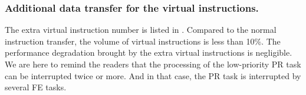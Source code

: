 \subsubsection{ Additional data transfer for the virtual instructions. }

The extra virtual instruction number is listed in . Compared to the normal instruction transfer, the volume of virtual instructions is less than 10\%. The performance degradation brought by the extra virtual instructions is negligible. 
We are here to remind the readers that the processing of the low-priority PR task can be interrupted twice or more. And in that case, the PR task is interrupted by several FE tasks.





  
